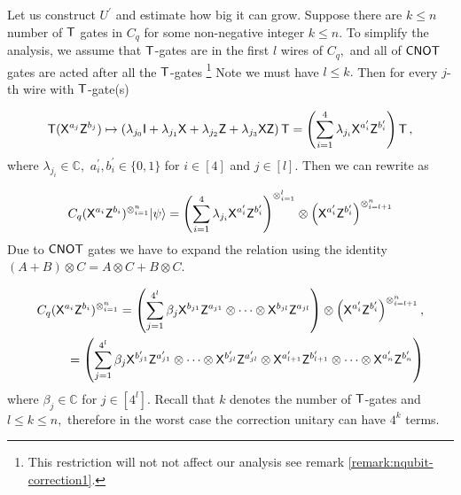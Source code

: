 Let us construct $U^\prime$ and estimate how big it can grow. Suppose there are $k\leq n$ number of ${\sf T}$ gates in $C_q$ for some non-negative integer $k\leq n.$ To simplify the analysis, we assume that ${\sf T}$-gates are in the first $l$ wires of $C_q,$ and all of ${\sf CNOT}$ gates are acted after all the ${\sf T}$-gates \footnote{This restriction will not not affect our analysis see remark \cref{remark:nqubit-correction1}.} Note we must have $l\leq k.$ Then for every $j$-th wire with ${\sf T}$-gate(s) 

\begin{equation}
\begin{aligned}
\label{nqubit:eq7}
{\sf T}({\sf X}^{a_{j}}{\sf Z}^{b_{j}})\mapsto \left(\lambda_{j_0} {\sf I} + \lambda_{j_1} {\sf X} + \lambda_{j_2} {\sf Z} + \lambda_{j_3} {\sf X} {\sf Z} \right){\sf T}=\left(\sum_{i=1}^4 \lambda_{j_i} {\sf X}^{a_{i}^\prime}{\sf Z}^{b_{i}^\prime}\right){\sf T}\,,\\
 \end{aligned}
\end{equation}
where $\lambda_{j_i}\in\mathbb{C}, $  $a_{i}^\prime, b_{i}^\prime \in\{0,1\}$ for $i\in[4]$ and $j\in[l].$ Then we can rewrite  as


\begin{equation}
\label{nqubit:eq8}
\begin{aligned}
 C_q ({\sf X}^{a_{i}}{\sf Z}^{b_{i}})^{\otimes_{i=1}^{n}}{\lvert}\psi\rangle= \left(\sum_{i=1}^4 \lambda_{j_i} {\sf X}^{a_{i}^\prime}{\sf Z}^{b_{i}^\prime}\right)^{\otimes_{i=1}^{l}} \otimes \left({\sf X}^{a_{i}^\prime}{\sf Z}^{b_{i}^\prime}\right)^{\otimes_{i=l+1}^{n}}\\
\end{aligned}
\end{equation}
Due to ${\sf CNOT}$ gates we have to expand the relation   using the identity $(A+B)\otimes C=A\otimes C + B\otimes C$. 


\begin{equation}
\label{nqubit:eq9}
\begin{aligned}
C_q ({\sf X}^{a_{i}}{\sf Z}^{b_{i}})^{\otimes_{i=1}^{n}}=\left(\sum_{j=1}^{4^l} \beta_j {\sf X}^{b_{j1}}{\sf Z}^{a_{j1}} \otimes \cdots \otimes{\sf X}^{b_{jl}}{\sf Z}^{a_{jl}}\right) \otimes \left({\sf X}^{a_{i}^\prime}{\sf Z}^{b_{i}^\prime}\right)^{\otimes_{i=l+1}^{n}}, \\
 =\left(\sum_{j=1}^{4^{l}} \beta_j {\sf X}^{b_{j1}^\prime}{\sf Z}^{a_{j1}^\prime} \otimes \cdots \otimes{\sf X}^{b_{jl}^\prime}{\sf Z}^{a_{jl}^\prime} \otimes {\sf X}^{a_{l+1}^\prime}{\sf Z}^{b_{l+1}^\prime}  \otimes \cdots   \otimes{\sf X}^{a_{n}^\prime}{\sf Z}^{b_{n}^\prime}\right)
 \end{aligned}
\end{equation}
where $\beta_j\in \mathbb{C}$ for $j\in[4^l].$  Recall that $k$ denotes the number of ${\sf T}$-gates and $l\leq k\leq n,$ therefore in the worst case the correction unitary can have $4^k$ terms.



